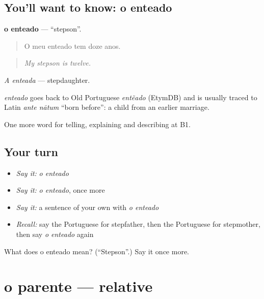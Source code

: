 \subsection*{You'll want to know: o enteado}
\textbf{o enteado} — \textquotedblleft{}stepson\textquotedblright{}.

\begin{quote}
O meu enteado tem doze anos.
\end{quote}

\begin{quote}
\emph{My stepson is twelve.}
\end{quote}

\emph{A enteada} — stepdaughter.

\begin{cousinweb}
\emph{enteado} goes back to Old Portuguese \emph{entẽado} (EtymDB) and is usually traced to Latin \emph{ante nātum} \textquotedblleft{}born before\textquotedblright{}: a child from an earlier marriage.
\end{cousinweb}

\begin{grammarlens}[title={What you've built}]
One more word for telling, explaining and describing at B1.
\end{grammarlens}

\subsection*{Your turn}
\begin{itemize}
\raggedright
  \item \emph{Say it:} \emph{o enteado}
  \item \emph{Say it:} \emph{o enteado}, once more
  \item \emph{Say it:} a sentence of your own with \emph{o enteado}
  \item \emph{Recall:} say the Portuguese for stepfather, then the Portuguese for stepmother, then say \emph{o enteado} again
\end{itemize}

\begin{tcolorbox}[breakable,colback=teal!4,colframe=teal!35!black,title={Before you move on}]
What does o enteado mean? (\textquotedblleft{}Stepson\textquotedblright{}.) Say it once more.
\end{tcolorbox}
\section[o parente]{o parente — relative}


